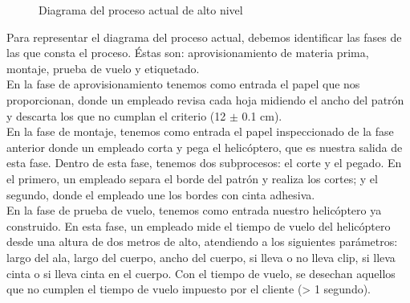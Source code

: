 \documentclass[12pt,a4paper,twoside,openright,titlepage,final]{article}
\begin{document}
\begin{figure}[htbp!]
	\centering
	\caption{Diagrama del proceso actual de alto nivel}
	\label{fig:diagrama_proceso_actual_altoç_nivel}
\end{figure} 

Para representar el diagrama del proceso actual, debemos identificar las fases de las que consta el proceso. Éstas son: aprovisionamiento de materia prima, montaje, prueba de vuelo y etiquetado.\\

En la fase de aprovisionamiento tenemos como entrada el papel que nos proporcionan, donde un empleado revisa cada hoja midiendo el ancho del patrón y descarta los que no cumplan el criterio (12 $\pm$ 0.1 cm).\\

En la fase de montaje, tenemos como entrada el papel inspeccionado de la fase anterior donde un empleado corta y pega el helicóptero, que es nuestra salida de esta fase. Dentro de esta fase, tenemos dos subprocesos: el corte y el pegado. En el primero, un empleado separa el borde del patrón y realiza los cortes; y el segundo, donde el empleado une los bordes con cinta adhesiva.\\

En la fase de prueba de vuelo, tenemos como entrada nuestro helicóptero ya construido. En esta fase, un empleado mide el tiempo de vuelo del helicóptero desde una altura de dos metros de alto, atendiendo a los siguientes parámetros: largo del ala, largo del cuerpo, ancho del cuerpo, si lleva o no lleva clip, si lleva cinta o si lleva cinta en el cuerpo. Con el tiempo de vuelo, se desechan aquellos que no cumplen el tiempo de vuelo impuesto por el cliente (> 1 segundo).\\
\end{document}
